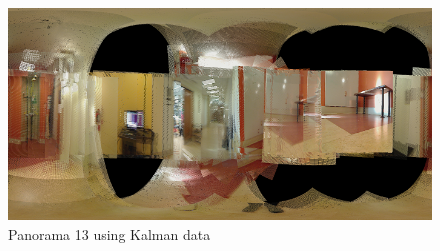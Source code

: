 \documentclass[a4paper]{article}
\begin{document}
\begin{figure}[h]
  \centering
    \includegraphics[width=1\textwidth]{pan_testset13_kalman_small.png}
  \caption{Panorama 13 using Kalman data\label{fig:panorama13_kalman}}
\end{figure}
\end{document}
